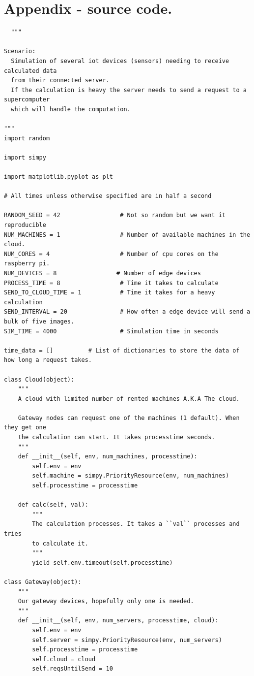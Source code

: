 \documentclass[a4paper,11pt,notitlepage,twocolumn]{article}
\begin{document}
  \section{Appendix - source code.}
  \begin{verbatim}
  """

Scenario:
  Simulation of several iot devices (sensors) needing to receive calculated data
  from their connected server.
  If the calculation is heavy the server needs to send a request to a supercomputer
  which will handle the computation.

"""
import random

import simpy

import matplotlib.pyplot as plt

# All times unless otherwise specified are in half a second

RANDOM_SEED = 42                 # Not so random but we want it reproducible
NUM_MACHINES = 1                 # Number of available machines in the cloud.
NUM_CORES = 4                    # Number of cpu cores on the raspberry pi.
NUM_DEVICES = 8                 # Number of edge devices
PROCESS_TIME = 8                 # Time it takes to calculate 
SEND_TO_CLOUD_TIME = 1           # Time it takes for a heavy calculation
SEND_INTERVAL = 20               # How often a edge device will send a bulk of five images.
SIM_TIME = 4000                  # Simulation time in seconds

time_data = []          # List of dictionaries to store the data of how long a request takes.

class Cloud(object):
    """
    A cloud with limited number of rented machines A.K.A The cloud.

    Gateway nodes can request one of the machines (1 default). When they get one
    the calculation can start. It takes processtime seconds.
    """
    def __init__(self, env, num_machines, processtime):
        self.env = env
        self.machine = simpy.PriorityResource(env, num_machines)
        self.processtime = processtime

    def calc(self, val):
        """
        The calculation processes. It takes a ``val`` processes and tries
        to calculate it.
        """
        yield self.env.timeout(self.processtime)

class Gateway(object):
    """
    Our gateway devices, hopefully only one is needed.
    """
    def __init__(self, env, num_servers, processtime, cloud):
        self.env = env
        self.server = simpy.PriorityResource(env, num_servers)
        self.processtime = processtime
        self.cloud = cloud
        self.reqsUntilSend = 10


\end{verbatim}
\end{document}
